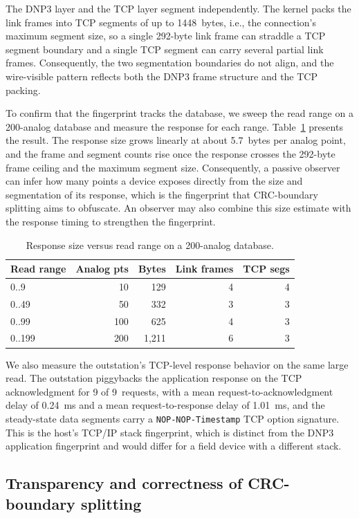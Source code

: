 \documentclass[conference]{IEEEtran}
\newcommand{\code}[1]{\texttt{#1}}
\begin{document}
The DNP3 layer and the TCP layer segment independently. The kernel packs the link
frames into TCP segments of up to 1448~bytes, i.e., the connection's maximum
segment size, so a single 292-byte link frame can straddle a TCP segment boundary
and a single TCP segment can carry several partial link frames. Consequently, the
two segmentation boundaries do not align, and the wire-visible pattern reflects
both the DNP3 frame structure and the TCP packing.

To confirm that the fingerprint tracks the database, we sweep the read range on a
200-analog database and measure the response for each range.
Table~\ref{tab:range} presents the result. The response size grows linearly at
about 5.7~bytes per analog point, and the frame and segment counts rise once the
response crosses the 292-byte frame ceiling and the maximum segment size.
Consequently, a passive observer can infer how many points a device exposes
directly from the size and segmentation of its response, which is the fingerprint
that CRC-boundary splitting aims to obfuscate. An observer may also combine this
size estimate with the response timing to strengthen the fingerprint.

\begin{table}[t]
\centering
\caption{Response size versus read range on a 200-analog database.}
\label{tab:range}
\begin{tabular}{@{}lrrrr@{}}
\toprule
Read range & Analog pts & Bytes & Link frames & TCP segs \\
\midrule
0..9   & 10  & 129   & 4 & 4 \\
0..49  & 50  & 332   & 3 & 3 \\
0..99  & 100 & 625   & 4 & 3 \\
0..199 & 200 & 1{,}211 & 6 & 3 \\
\bottomrule
\end{tabular}
\end{table}

We also measure the outstation's TCP-level response behavior on the same large
read. The outstation piggybacks the application response on the TCP
acknowledgment for 9 of 9~requests, with a mean request-to-acknowledgment delay
of 0.24~ms and a mean request-to-response delay of 1.01~ms, and the steady-state
data segments carry a \code{NOP-NOP-Timestamp} TCP option signature. This is the
host's TCP/IP stack fingerprint, which is distinct from the DNP3 application
fingerprint and would differ for a field device with a different stack.

\subsection{Transparency and correctness of CRC-boundary splitting}
\end{document}
